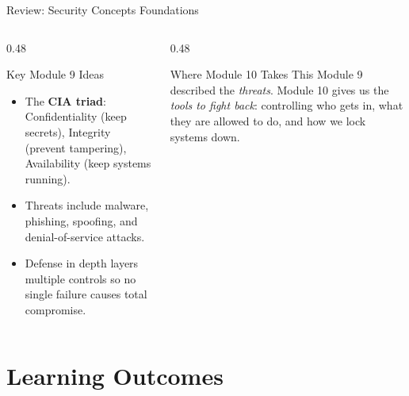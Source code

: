 \documentclass[aspectratio=169]{beamer}  %
\begin{document}
\begin{frame}{Review: Security Concepts Foundations}
    \begin{columns}[T]
        \begin{column}{0.48\textwidth}
            \begin{block}{Key Module 9 Ideas}
                \begin{itemize}
                    \item The \textbf{CIA triad}: Confidentiality (keep secrets), Integrity (prevent tampering), Availability (keep systems running).
                    \item Threats include malware, phishing, spoofing, and denial-of-service attacks.
                    \item Defense in depth layers multiple controls so no single failure causes total compromise.
                \end{itemize}
            \end{block}
        \end{column}
        \begin{column}{0.48\textwidth}
            \begin{alertblock}{Where Module 10 Takes This}
                Module 9 described the \emph{threats}. Module 10 gives us the \emph{tools to fight back}: controlling who gets in, what they are allowed to do, and how we lock systems down.
            \end{alertblock}
        \end{column}
    \end{columns}
\end{frame}

\section*{Learning Outcomes}
\end{document}

